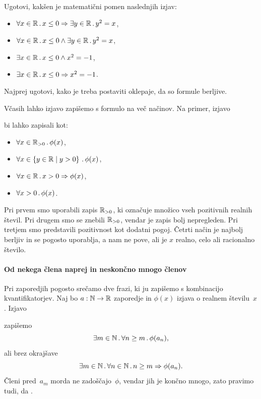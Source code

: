 \begin{vaja}
  Ugotovi, kakšen je matematični pomen naslednjih izjav:
  \begin{itemize}
  \item $\forall x \in \mathbb{R} \,.\, x \leq 0 \Rightarrow \exists y \in \mathbb{R} \,.\, y^2 = x$,
  \item $\forall x \in \mathbb{R} \,.\, x \leq 0 \land \exists y \in \mathbb{R} \,.\, y^2 = x$,
  \item $\exists x \in \mathbb{R} \,.\, x \leq 0 \land x^2 = -1$,
  \item $\exists x \in \mathbb{R} \,.\, x \leq 0 \Rightarrow x^2 = -1$.
  \end{itemize}
  Najprej ugotovi, kako je treba postaviti oklepaje, da so formule berljive.
\end{vaja}


Včasih lahko izjavo zapišemo s formulo na več načinov. Na primer, izjavo
%
\begin{quote}
\end{quote}
%
bi lahko zapisali kot:
%
\begin{itemize}
\item $\forall x \in \mathbb{R}_{> 0} \,.\, \phi(x)$,
\item $\forall x \in \left\{y \in \mathbb{R} \; \middle| \; y > 0\right\} \,.\, \phi(x)$,
\item $\forall x \in \mathbb{R} \,.\, x > 0 \Rightarrow \phi(x)$,
\item $\forall x > 0 \,.\, \phi(x)$.
\end{itemize}
%
Pri prvem smo uporabili zapis $\mathbb{R}_{> 0}$, ki označuje množico vseh pozitivnih realnih števil.
Pri drugem smo se znebili $\mathbb{R}_{> 0}$, vendar je zapis bolj nepregleden.
Pri tretjem smo predstavili pozitivnost kot dodatni pogoj.
Četrti način je najbolj berljiv in se pogosto uporablja, a nam ne pove, ali je $x$ realno, celo ali racionalno število.

\paragraph*{Od nekega člena naprej in neskončno mnogo členov}

Pri zaporedjih pogosto srečamo dve frazi, ki ju zapišemo s kombinacijo kvantifikatorjev.
Naj bo $a : \mathbb{N} \to \mathbb{R}$ zaporedje in $\phi(x)$ izjava o realnem številu~$x$.
%
Izjavo
%
\begin{quote}
\end{quote}
%
zapišemo
%
\begin{equation*}
  \exists m \in \mathbb{N} \,.\, \forall n \geq m \,.\, \phi(a_n),
\end{equation*}
%
ali brez okrajšave
%
\begin{equation*}
  \exists m \in \mathbb{N} \,.\, \forall n \in \mathbb{N} \,.\, n \geq m \Rightarrow \phi(a_n).
\end{equation*}
%
Členi pred~$a_m$ morda ne zadoščajo~$\phi$, vendar jih je končno mnogo, zato pravimo tudi, da .

